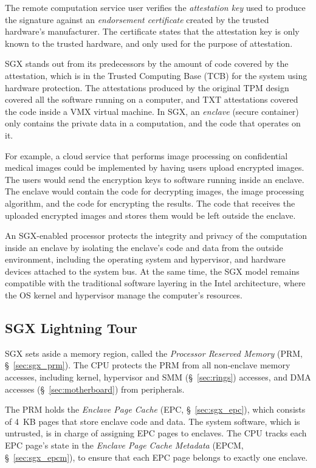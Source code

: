 The remote computation service user verifies the \textit{attestation key} used
to produce the signature against an \textit{endorsement certificate} created by
the trusted hardware's manufacturer. The certificate states that the
attestation key is only known to the trusted hardware, and only used for the
purpose of attestation.

SGX stands out from its predecessors by the amount of code covered by the
attestation, which is in the Trusted Computing Base (TCB) for the system using
hardware protection. The attestations produced by the original TPM design
covered all the software running on a computer, and TXT attestations covered
the code inside a VMX \cite{uhlig2005vmx} virtual machine. In SGX, an
\textit{enclave} (secure container) only contains the private data in a
computation, and the code that operates on it.

For example, a cloud service that performs image processing on confidential
medical images could be implemented by having users upload encrypted images.
The users would send the encryption keys to software running inside an enclave.
The enclave would contain the code for decrypting images, the image processing
algorithm, and the code for encrypting the results. The code that receives the
uploaded encrypted images and stores them would be left outside the enclave.

An SGX-enabled processor protects the integrity and privacy of the computation
inside an enclave by isolating the enclave's code and data from the outside
environment, including the operating system and hypervisor, and hardware
devices attached to the system bus. At the same time, the SGX model remains
compatible with the traditional software layering in the Intel architecture,
where the OS kernel and hypervisor manage the computer's resources.


\subsection{SGX Lightning Tour}
\label{sec:intro_sgx}

SGX sets aside a memory region, called the \textit{Processor Reserved Memory}
(PRM, \S~\ref{sec:sgx_prm}). The CPU protects the PRM from all non-enclave
memory accesses, including kernel, hypervisor and SMM (\S~\ref{sec:rings})
accesses, and DMA accesses (\S~\ref{sec:motherboard}) from peripherals.

The PRM holds the \textit{Enclave Page Cache} (EPC, \S~\ref{sec:sgx_epc}),
which consists of 4~KB pages that store enclave code and data. The system
software, which is untrusted, is in charge of assigning EPC pages to enclaves.
The CPU tracks each EPC page's state in the \textit{Enclave Page Cache
Metadata} (EPCM, \S~\ref{sec:sgx_epcm}), to ensure that each EPC page belongs
to exactly one enclave.

